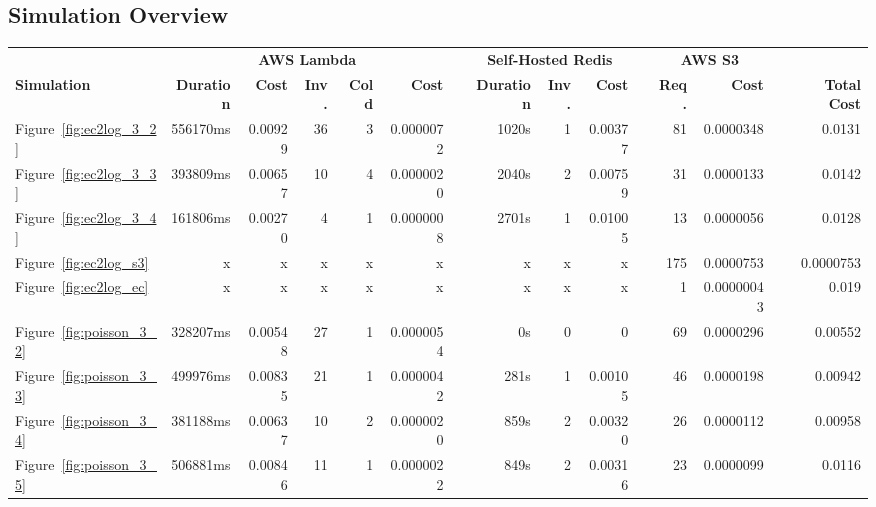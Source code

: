 \newpage
\begin{landscape}
    \section{Simulation Overview}
    \label{sec:simulation_overview}
    \begin{table*}[ht!]
        \centering
        \begin{adjustbox}{max width=\linewidth}
        \begin{tabular}{ @{} l r r r r r c r r r c r r c r @{}}
        \toprule
        & \multicolumn{5}{c}{\textbf{AWS Lambda}} & \phantom{abc} & \multicolumn{3}{c}{\textbf{Self-Hosted Redis}} & \phantom{abc} & \multicolumn{2}{c}{\textbf{AWS S3}} & \phantom{abc} & \phantom{abc} \\
        \cmidrule{2-6} \cmidrule{8-10} \cmidrule{12-13}
        \textbf{Simulation} & \textbf{Duration} & \textbf{Cost} & \textbf{Inv.} & \textbf{Cold} & \textbf{Cost} && \textbf{Duration} & \textbf{Inv.} & \textbf{Cost} && \textbf{Req.} & \textbf{Cost} && \textbf{Total Cost}\\
        \midrule
        Figure~\ref{fig:ec2log_3_2} &   556170ms & 0.00929 & 36 & 3 & 0.0000072 && 1020s & 1 & 0.00377 && 81  & 0.0000348 && 0.0131 \\
        Figure~\ref{fig:ec2log_3_3} &   393809ms & 0.00657 & 10 & 4 & 0.0000020 && 2040s & 2 & 0.00759 && 31  & 0.0000133 && 0.0142 \\
        Figure~\ref{fig:ec2log_3_4} &   161806ms & 0.00270 & 4 &  1 & 0.0000008 && 2701s & 1 & 0.01005 && 13  & 0.0000056 && 0.0128 \\
        Figure~\ref{fig:ec2log_s3} &    x &        x &       x &  x & x         && x     & x & x       && 175 & 0.0000753 && 0.0000753 \\
        Figure~\ref{fig:ec2log_ec} &    x &        x &       x &  x & x         && x     & x & x       && 1   & 0.00000043 && 0.019 \\
        Figure~\ref{fig:poisson_3_2} &  328207ms & 0.00548 & 27 & 1 & 0.0000054 && 0s    & 0 & 0       && 69  & 0.0000296 && 0.00552 \\
        Figure~\ref{fig:poisson_3_3} &  499976ms & 0.00835 & 21 & 1 & 0.0000042 && 281s  & 1 & 0.00105 && 46  & 0.0000198 && 0.00942 \\
        Figure~\ref{fig:poisson_3_4} &  381188ms & 0.00637 & 10 & 2 & 0.0000020 && 859s  & 2 & 0.00320 && 26  & 0.0000112 && 0.00958 \\
        Figure~\ref{fig:poisson_3_5} &  506881ms & 0.00846 & 11 & 1 & 0.0000022 && 849s  & 2 & 0.00316 && 23  & 0.0000099 && 0.0116 \\

\end{tabular}
\end{adjustbox}
\end{table*}
\end{landscape}
